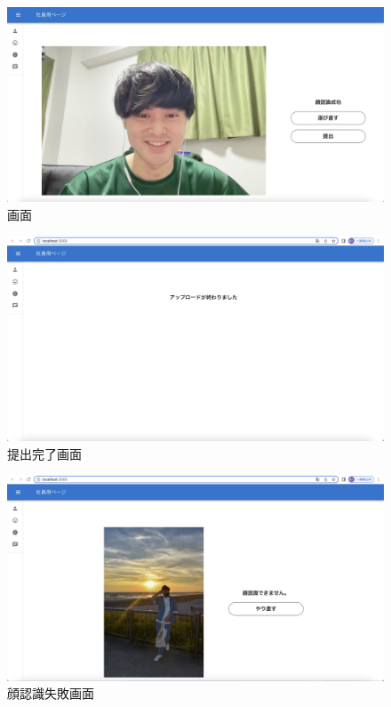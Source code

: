 \begin{figure}[!h]
	\begin{center}
			\includegraphics[scale=0.3, clip]{./img/sample3.png}
			\caption{画面}
			\label{fig:図の名前}
	\end{center}
\end{figure}

\begin{figure}[!h]
	\begin{center}
			\includegraphics[scale=0.3, clip]{./img/sample4.png}
			\caption{提出完了画面}
			\label{fig:図の名前}
	\end{center}
\end{figure}

\clearpage

\begin{figure}[!h]
	\begin{center}
			\includegraphics[scale=0.3, clip]{./img/sample5.png}
			\caption{顔認識失敗画面}
			\label{fig:図の名前}
	\end{center}
\end{figure}


